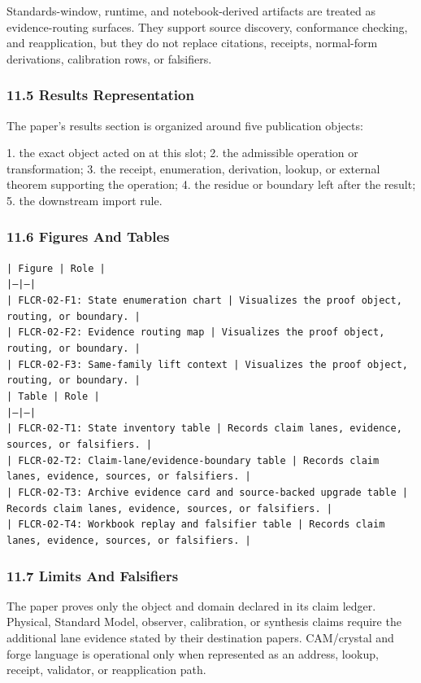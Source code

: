 \documentclass[11pt]{article}
\begin{document}
Standards-window, runtime, and notebook-derived artifacts are treated
as evidence-routing surfaces. They support source discovery, conformance
checking, and reapplication, but they do not replace citations, receipts,
normal-form derivations, calibration rows, or falsifiers.

\subsubsection*{11.5 Results Representation}

The paper's results section is organized around five publication objects:

1. the exact object acted on at this slot;
2. the admissible operation or transformation;
3. the receipt, enumeration, derivation, lookup, or external theorem supporting
   the operation;
4. the residue or boundary left after the result;
5. the downstream import rule.

\subsubsection*{11.6 Figures And Tables}

\noindent\texttt{| Figure | Role |}\\
\noindent\texttt{|---|---|}\\
\noindent\texttt{| FLCR-02-F1: State enumeration chart | Visualizes the proof object, routing, or boundary. |}\\
\noindent\texttt{| FLCR-02-F2: Evidence routing map | Visualizes the proof object, routing, or boundary. |}\\
\noindent\texttt{| FLCR-02-F3: Same-family lift context | Visualizes the proof object, routing, or boundary. |}\\

\noindent\texttt{| Table | Role |}\\
\noindent\texttt{|---|---|}\\
\noindent\texttt{| FLCR-02-T1: State inventory table | Records claim lanes, evidence, sources, or falsifiers. |}\\
\noindent\texttt{| FLCR-02-T2: Claim-lane/evidence-boundary table | Records claim lanes, evidence, sources, or falsifiers. |}\\
\noindent\texttt{| FLCR-02-T3: Archive evidence card and source-backed upgrade table | Records claim lanes, evidence, sources, or falsifiers. |}\\
\noindent\texttt{| FLCR-02-T4: Workbook replay and falsifier table | Records claim lanes, evidence, sources, or falsifiers. |}\\

\subsubsection*{11.7 Limits And Falsifiers}

The paper proves only the object and domain declared in its claim ledger.
Physical, Standard Model, observer, calibration, or synthesis claims require
the additional lane evidence stated by their destination papers. CAM/crystal
and forge language is operational only when represented as an address, lookup,
receipt, validator, or reapplication path.
\end{document}
